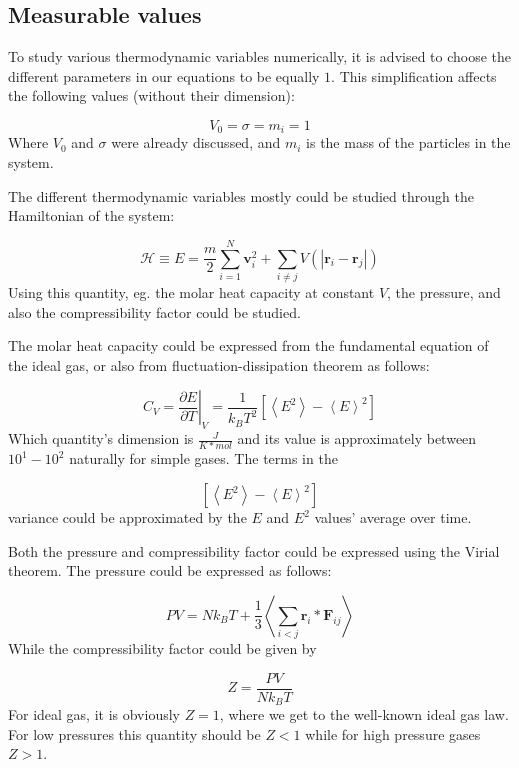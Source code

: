 \begin{multicols}{2}
\section{Measurable values}
To study various thermodynamic variables numerically, it is advised to choose the different parameters in our equations to be equally $1$. This simplification affects the following values (without their dimension):

\begin{equation}
V_{0} = \sigma = m_{i} = 1
\end{equation}
Where $V_{0}$ and $\sigma$ were already discussed, and $m_{i}$ is the mass of the particles in the system. \par
The different thermodynamic variables mostly could be studied through the Hamiltonian of the system:

\begin{equation}
\mathcal{H}
\equiv
E
=
\frac{m}{2} \sum_{i=1}^{N} \boldsymbol{v}_{i}^{2}
+
\sum_{i \neq j} V \left( \left| \boldsymbol{r}_{i} - \boldsymbol{r}_{j} \right| \right)
\end{equation}
Using this quantity, eg. the molar heat capacity at constant $V$, the pressure, and also the compressibility factor could be studied. \par
The molar heat capacity could be expressed from the fundamental equation of the ideal gas, or also from fluctuation-dissipation theorem as follows:

\begin{equation}
C_{V}
=
\left. \frac{\partial E}{\partial T} \right|_{V}
=
\frac{1}{k_{B} T^{2}} \left[ \left< E^{2} \right> - \left< E \right>^{2} \right]
\end{equation}
Which quantity's dimension is $\frac{J}{K * mol}$ and its value is approximately between $10^{1} - 10^{2}$ naturally for simple gases. The terms in the

\begin{equation}
\left[ \left< E^{2} \right> - \left< E \right>^{2} \right]
\end{equation}
variance could be approximated by the $E$ and $E^{2}$ values' average over time. \par
Both the pressure and compressibility factor could be expressed using the Virial theorem. The pressure could be expressed as follows:

\begin{equation}
PV
=
N k_{B} T + \frac{1}{3} \left< \sum_{i < j} \boldsymbol{r}_{i} * \boldsymbol{F}_{ij} \right>
\end{equation}
While the compressibility factor could be given by

\begin{equation}
Z
=
\frac{PV}{N k_{B} T}
\end{equation}
For ideal gas, it is obviously $Z = 1$, where we get to the well-known ideal gas law. For low pressures this quantity should be $Z < 1$ while for high pressure gases $Z > 1$.

\end{multicols}
